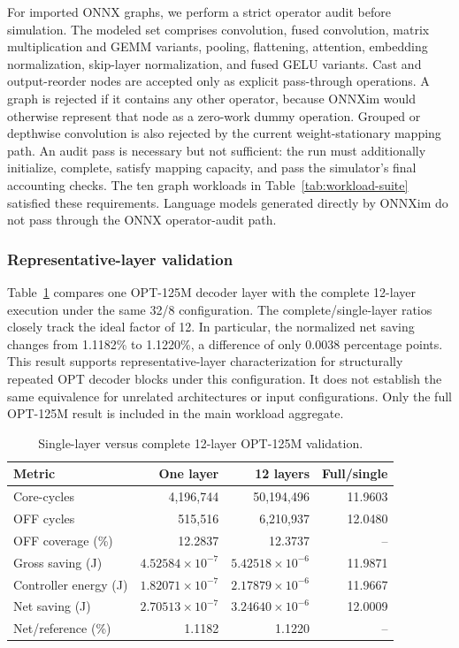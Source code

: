 For imported ONNX graphs, we perform a strict operator audit before simulation.
The modeled set comprises convolution, fused convolution, matrix multiplication
and GEMM variants, pooling, flattening, attention, embedding normalization,
skip-layer normalization, and fused GELU variants.  Cast and output-reorder
nodes are accepted only as explicit pass-through operations.  A graph is
rejected if it contains any other operator, because ONNXim would otherwise
represent that node as a zero-work dummy operation.  Grouped or depthwise
convolution is also rejected by the current weight-stationary mapping path.
An audit pass is necessary but not sufficient: the run must additionally
initialize, complete, satisfy mapping capacity, and pass the simulator's final
accounting checks.  The ten graph workloads in Table~\ref{tab:workload-suite}
satisfied these requirements.  Language models generated directly by ONNXim
do not pass through the ONNX operator-audit path.

\subsubsection{Representative-layer validation}
\label{sec:representative-layer-validation}

Table~\ref{tab:representative-layer} compares one OPT-125M decoder layer with
the complete 12-layer execution under the same 32/8 configuration.  The
complete/single-layer ratios closely track the ideal factor of 12.  In
particular, the normalized net saving changes from 1.1182\% to 1.1220\%, a
difference of only 0.0038 percentage points.  This result supports
representative-layer characterization for structurally repeated OPT decoder
blocks under this configuration.  It does not establish the same equivalence
for unrelated architectures or input configurations.  Only the full
OPT-125M result is included in the main workload aggregate.

\begin{table}[t]
  \centering
  \footnotesize
  \setlength{\tabcolsep}{3pt}
  \caption{Single-layer versus complete 12-layer OPT-125M validation.}
  \label{tab:representative-layer}
  \begin{tabular}{lrrr}
    \toprule
    Metric & One layer & 12 layers & Full/single \\
    \midrule
    Core-cycles & 4,196,744 & 50,194,496 & 11.9603 \\
    OFF cycles & 515,516 & 6,210,937 & 12.0480 \\
    OFF coverage (\%) & 12.2837 & 12.3737 & -- \\
    Gross saving (J) & $4.52584\!\times\!10^{-7}$ & $5.42518\!\times\!10^{-6}$ & 11.9871 \\
    Controller energy (J) & $1.82071\!\times\!10^{-7}$ & $2.17879\!\times\!10^{-6}$ & 11.9667 \\
    Net saving (J) & $2.70513\!\times\!10^{-7}$ & $3.24640\!\times\!10^{-6}$ & 12.0009 \\
    Net/reference (\%) & 1.1182 & 1.1220 & -- \\
    \bottomrule
  \end{tabular}
\end{table}

